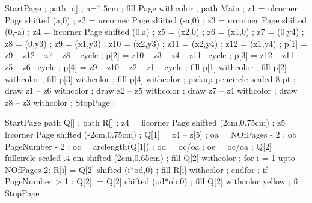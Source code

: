 


\definecolor [lightb]           [s=.75]
\definecolor [darkb] 	        [s=.2]
\definecolor [BackgroundColor]  [s=.6]
\definecolor [FrameColor]       [r=.55, g=0, b=.04]
\definecolor [Item]             [r=.55, g=0, b=.04]
\definecolor [DarkYellow]       [s=.6]%


StartPage ;
path p[] ;
a=1.5cm ;
fill Page withcolor  ;
path Main ;
z1 = ulcorner Page shifted (a,0) ;
z2 = urcorner Page shifted (-a,0) ;
z3 = urcorner Page shifted (0,-a) ;
z4 = lrcorner Page shifted (0,a) ;
z5 = (x2,0) ;
z6 = (x1,0) ;
z7 = (0,y4) ;
z8 = (0,y3) ;
z9 = (x1,y3) ;
z10 = (x2,y3) ;
z11 = (x2,y4) ;
z12 = (x1,y4) ;
p[1] = z9 -- z12 -- z7 -- z8 -- cycle ;
p[2] = z10 -- z3 -- z4 -- z11 --cycle ;
p[3] = z12 -- z11 -- z5 -- z6 --cycle ;
p[4] = z9 -- z10 -- z2 -- z1 -- cycle ;
fill p[1] withcolor  ;
fill p[2] withcolor  ;
fill p[3] withcolor  ;
fill p[4] withcolor  ;
pickup pencircle scaled 8 pt ;
draw z1 -- z6 withcolor  ;
draw z2 -- z5 withcolor  ;
draw z7 -- z4 withcolor  ;
draw z8 -- z3 withcolor  ;
StopPage ;
\stopuniqueMPgraphic 

StartPage
path Q[] ;
path R[] ;
z4 = llcorner Page shifted (2cm,0.75cm) ;
z5 = lrcorner Page shifted (-2cm,0.75cm) ;
Q[1] = z4 -- z[5] ;
oa = NOfPages - 2 ;
ob = PageNumber - 2 ;
oc = arclength(Q[1]) ;
od = oc/oa ;
oe = oc/oa ;
Q[2] = fullcircle scaled .4 cm shifted (2cm,0.65cm) ;
fill Q[2] withcolor  ;
for i = 1 upto NOfPages-2:
	R[i] = Q[2] shifted (i*od,0) ;
	fill R[i] withcolor  ;
endfor ;
if PageNumber > 1 :
	Q[2] := Q[2] shifted (od*ob,0) ;
	fill Q[2] withcolor yellow ;
fi ;
StopPage
\stopuseMPgraphic

